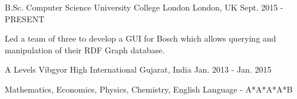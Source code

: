 

\begin{cventries}

  \cventry
    {B.Sc. Computer Science}
    {University College London}
    {London, UK}
    {Sept. 2015 - PRESENT}
    {
      \begin{cvitems}
        \item {Led a team of three to develop a GUI for Bosch which allows querying and manipulation of their RDF Graph database.}
      \end{cvitems}
    }

  \cventry
    {A Levels}
    {Vibgyor High International}
    {Gujarat, India}
    {Jan. 2013 - Jan. 2015}
    {
      \begin{cvitems}
        \item {Mathematics, Economics, Physics, Chemistry, English Language - A*A*A*A*B}
      \end{cvitems}
    }
\end{cventries}
